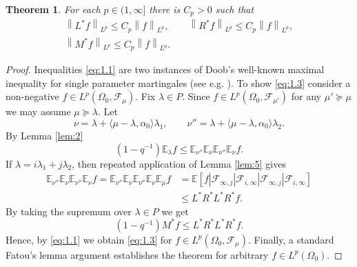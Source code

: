\documentclass[a4paper]{amsart}
\newcommand{\sprod}[2]{{\langle #1, #2\rangle}}
\newcommand{\norm}[1]{{\left\lVert #1 \right\rVert}}
\newcommand{\EE}{\mathbb{E}}
\theoremstyle{plain}
\newtheorem{theorem}{Theorem}
\theoremstyle{definition}
\theoremstyle{remark}
\numberwithin{equation}{section}
\theoremstyle{plain}
\begin{document}
\begin{theorem}
\label{th:1}
For each $p \in (1, \infty]$ there is $C_p > 0$ such that
\begin{gather}
  \label{eq:1.1}
  \norm{L^* f}_{L^p} \leq C_p \norm{f}_{L^p},\qquad
  \norm{R^* f}_{L^p} \leq C_p \norm{f}_{L^p},\\
  \label{eq:1.3}
  \norm{M^* f}_{L^p} \leq C_p \norm{f}_{L^p}.
\end{gather}
\end{theorem}
\begin{proof}
  Inequalities \eqref{eq:1.1} are two instances of Doob's well-known
  maximal inequality for single parameter martingales (see e.g.
  \cite{stein1}). To show \eqref{eq:1.3} consider a non-negative $f
  \in L^p(\Omega_0, \mathcal{F}_\mu)$. Fix $\lambda \in P$. Since $f
  \in L^p(\Omega_0, \mathcal{F}_{\mu'})$ for any $\mu' \succeq \mu$ we
  may assume $\mu \succeq \lambda$. Let
  \begin{equation*}
    \nu = \lambda + \sprod{\mu - \lambda}{\alpha_0} \lambda_1, 
    \qquad
    \nu'' = \lambda + \sprod{\mu - \lambda}{\alpha_0} \lambda_2.
  \end{equation*}
  By Lemma \ref{lem:2}
  \begin{equation*}
    (1- q^{-1}) \EE_\lambda f
    \leq 
    \EE_{\nu''} \EE_{\nu} \EE_{\nu''} \EE_{\nu} f.
  \end{equation*}
  If $\lambda = i \lambda_1 + j \lambda_2$, then repeated application
  of Lemma \ref{lem:5} gives
  \begin{align*}
    \EE_{\nu''} \EE_{\nu} \EE_{\nu''} \EE_{\nu} f = \EE_{\nu''}
    \EE_{\nu} \EE_{\nu''} \EE_{\nu} \EE_\mu f & = \EE[f |
      \mathcal{F}_{\infty, j} | \mathcal{F}_{i, \infty} |
      \mathcal{F}_{\infty, j} | \mathcal{F}_{i, \infty} ] \\
	& \leq L^* R^* L^*  R^* f.
  \end{align*}
  By taking the supremum over $\lambda \in P$ we get
  \begin{equation*}
    (1 - q^{-1}) M^* f 
    \leq
    L^* R^* L^* R^* f.
  \end{equation*}
  Hence, by \eqref{eq:1.1} we obtain \eqref{eq:1.3} for $f \in
  L^p(\Omega_0, \mathcal{F}_\mu)$.  Finally, a standard Fatou's lemma
  argument establishes the theorem for arbitrary $f \in
  L^p(\Omega_0)$.
\end{proof}
\end{document}
